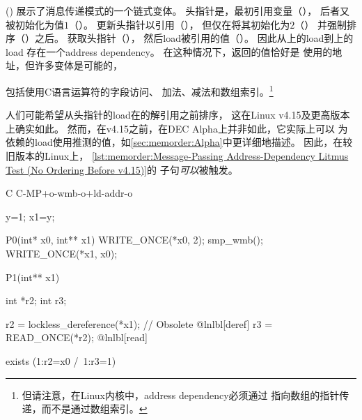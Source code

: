 \begin{listing}

\caption{消息传递Address Dependency Litmus Test（v4.15之前无排序）}
\label{lst:memorder:Message-Passing Address-Dependency Litmus Test (No Ordering Before v4.15)}
\end{listing}

\begin{fcvref}
()
展示了消息传递模式的一个链式变体。
头指针是，最初引用变量（），
后者又被初始化为值$1$（）。
更新头指针以引用（），
但仅在将其初始化为$2$（）
并强制排序（）之后。
获取头指针（），
然后load被引用的值（）。
因此从上的load到上的load
存在一个address dependency。
在这种情况下，返回的值恰好是
使用的地址，但许多变体是可能的，
\end{fcvref}
包括使用C语言\co{->}运算符的字段访问、
加法、减法和数组索引。\footnote{
	但请注意，在Linux内核中，address dependency必须通过
	指向数组的指针传递，而不是通过数组索引。}

\begin{fcvref}
人们可能希望从头指针的load在的解引用之前排序，
这在Linux v4.15及更高版本上确实如此。
然而，在v4.15之前，在DEC Alpha上并非如此，它实际上可以
为依赖的load使用推测的值，如\cref{sec:memorder:Alpha}中更详细地描述。
因此，在较旧版本的Linux上，
\cref{lst:memorder:Message-Passing Address-Dependency Litmus Test (No Ordering Before v4.15)}的
子句\emph{可以}被触发。
\end{fcvref}

\begin{listing}
\begin{fcvlabel}
\begin{VerbatimL}[commandchars=\@\[\]]
C C-MP+o-wmb-o+ld-addr-o

{
y=1;
x1=y;
}

P0(int* x0, int** x1) {
	WRITE_ONCE(*x0, 2);
	smp_wmb();
	WRITE_ONCE(*x1, x0);
}

P1(int** x1) {
	int *r2;
	int r3;

	r2 = lockless_dereference(*x1); // Obsolete @lnlbl[deref]
	r3 = READ_ONCE(*r2);			    @lnlbl[read]
}

exists (1:r2=x0 /\ 1:r3=1)
\end{VerbatimL}
\end{fcvlabel}
\caption{强制消息传递Address Dependency Litmus Test的排序（v4.15之前）}
\label{lst:memorder:Enforced Ordering of Message-Passing Address-Dependency Litmus Test (Before v4.15)}
\end{listing}

